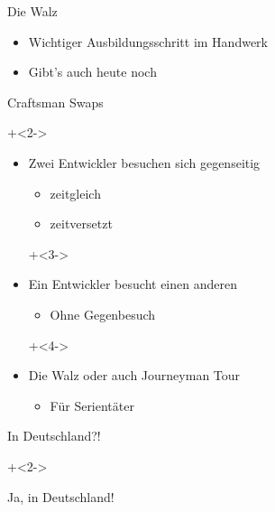 \begin{frame}{Die Walz}

\begin{itemize}
\item Wichtiger Ausbildungsschritt im Handwerk

\item Gibt's auch heute noch
\end{itemize}

\end{frame}

\begin{frame}{Craftsman Swaps}

\onslide+<2->

\begin{itemize}
\item Zwei Entwickler besuchen sich gegenseitig
\begin{itemize}
\item zeitgleich
\item zeitversetzt
\end{itemize}

\onslide+<3->

\item Ein Entwickler besucht einen anderen
\begin{itemize}
\item Ohne Gegenbesuch
\end{itemize}

\onslide+<4->

\item Die \glqq Walz\grqq{} oder auch \glqq Journeyman Tour\grqq{}
\begin{itemize}
\item Für Serientäter
\end{itemize}

\end{itemize}

\end{frame}

\begin{frame}{In Deutschland?!}

\onslide+<2->

\begin{center}
\Large
Ja, in Deutschland!
\end{center}

\end{frame}


